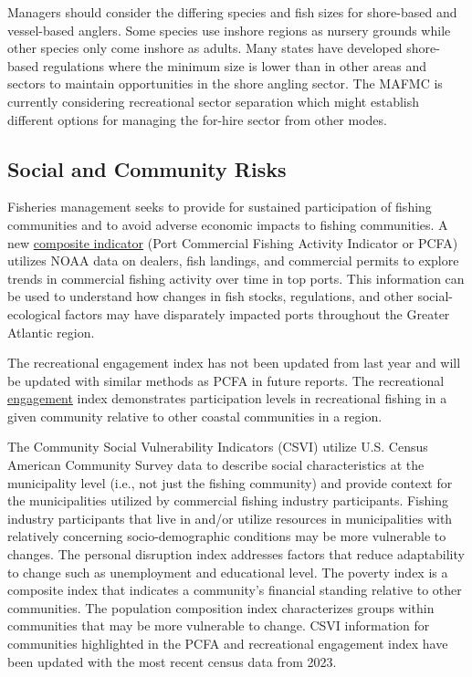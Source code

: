 \documentclass[
  10pt,
]{article}
\begin{document}
Managers should consider the differing species and fish sizes for shore-based and vessel-based anglers. Some species use inshore regions as nursery grounds while other species only come inshore as adults. Many states have developed shore-based regulations where the minimum size is lower than in other areas and sectors to maintain opportunities in the shore angling sector. The MAFMC is currently considering recreational sector separation which might establish different options for managing the for-hire sector from other modes.

\subsection{Social and Community Risks}\label{social-and-community-risks}

Fisheries management seeks to provide for sustained participation of fishing communities and to avoid adverse economic impacts to fishing communities. A new \href{https://noaa-edab.github.io/catalog/engagement.html?q=engage\#introduction-to-indicator-72}{composite indicator} (Port Commercial Fishing Activity Indicator or PCFA) utilizes NOAA data on dealers, fish landings, and commercial permits to explore trends in commercial fishing activity over time in top ports. This information can be used to understand how changes in fish stocks, regulations, and other social-ecological factors may have disparately impacted ports throughout the Greater Atlantic region.

The recreational engagement index has not been updated from last year and will be updated with similar methods as PCFA in future reports. The recreational \href{https://noaa-edab.github.io/catalog/engagement.html}{engagement} index demonstrates participation levels in recreational fishing in a given community relative to other coastal communities in a region.

The Community Social Vulnerability Indicators (CSVI) utilize U.S. Census American Community Survey data to describe social characteristics at the municipality level (i.e., not just the fishing community) and provide context for the municipalities utilized by commercial fishing industry participants. Fishing industry participants that live in and/or utilize resources in municipalities with relatively concerning socio-demographic conditions may be more vulnerable to changes. The personal disruption index addresses factors that reduce adaptability to change such as unemployment and educational level. The poverty index is a composite index that indicates a community's financial standing relative to other communities. The population composition index characterizes groups within communities that may be more vulnerable to change. CSVI information for communities highlighted in the PCFA and recreational engagement index have been updated with the most recent census data from 2023.
\end{document}

